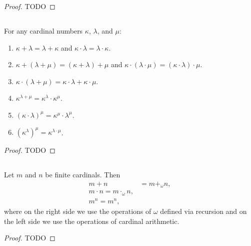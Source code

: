 \documentclass{report}
\begin{document}
  \begin{proof}
    TODO
  \end{proof}

\subsection{}%

  For any cardinal numbers $\kappa$, $\lambda$, and $\mu$:
    \begin{enumerate}
      \item $\kappa + \lambda = \lambda + \kappa$ and
        $\kappa \cdot \lambda = \lambda \cdot \kappa$.
      \item $\kappa + (\lambda + \mu) = (\kappa + \lambda) + \mu$ and
        $\kappa \cdot (\lambda \cdot \mu) = (\kappa \cdot \lambda) \cdot \mu$.
      \item $\kappa \cdot (\lambda + \mu) =
        \kappa \cdot \lambda + \kappa \cdot \mu$.
      \item $\kappa^{\lambda + \mu} = \kappa^\lambda \cdot \kappa^\mu$.
      \item $(\kappa \cdot \lambda)^\mu = \kappa^\mu \cdot \lambda^\mu$.
      \item $(\kappa^\lambda)^\mu = \kappa^{\lambda \cdot \mu}$.
    \end{enumerate}

  \begin{proof}
    TODO
  \end{proof}

\subsection{}%

  Let $m$ and $n$ be finite cardinals.
  Then
    \begin{align*}
      m + n & = m +_\omega n, \\
      m \cdot n = m \cdot_\omega n, \\
      m^n = m^n,
    \end{align*}
    where on the right side we use the operations of $\omega$ defined via
    recursion and on the left side we use the operations of cardinal arithmetic.

  \begin{proof}
    TODO
  \end{proof}

\subsection{}%
\end{document}
